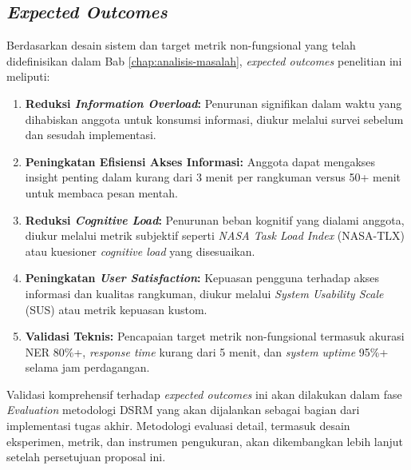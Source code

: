 \subsection{\textit{Expected Outcomes}}

Berdasarkan desain sistem dan target metrik non-fungsional yang telah didefinisikan dalam Bab \ref{chap:analisis-masalah}, \textit{expected outcomes} penelitian ini meliputi:

\begin{enumerate}
\item \textbf{Reduksi \textit{Information Overload}:} Penurunan signifikan dalam waktu yang dihabiskan anggota untuk konsumsi informasi, diukur melalui survei sebelum dan sesudah implementasi.

\item \textbf{Peningkatan Efisiensi Akses Informasi:} Anggota dapat mengakses insight penting dalam kurang dari 3 menit per rangkuman versus 50+ menit untuk membaca pesan mentah.

\item \textbf{Reduksi \textit{Cognitive Load}:} Penurunan beban kognitif yang dialami anggota, diukur melalui metrik subjektif seperti \textit{NASA Task Load Index} (NASA-TLX) atau kuesioner \textit{cognitive load} yang disesuaikan.

\item \textbf{Peningkatan \textit{User Satisfaction}:} Kepuasan pengguna terhadap akses informasi dan kualitas rangkuman, diukur melalui \textit{System Usability Scale} (SUS) atau metrik kepuasan kustom.

\item \textbf{Validasi Teknis:} Pencapaian target metrik non-fungsional termasuk akurasi NER 80\%+, \textit{response time} kurang dari 5 menit, dan \textit{system uptime} 95\%+ selama jam perdagangan.
\end{enumerate}

Validasi komprehensif terhadap \textit{expected outcomes} ini akan dilakukan dalam fase \textit{Evaluation} metodologi DSRM yang akan dijalankan sebagai bagian dari implementasi tugas akhir. Metodologi evaluasi detail, termasuk desain eksperimen, metrik, dan instrumen pengukuran, akan dikembangkan lebih lanjut setelah persetujuan proposal ini.
